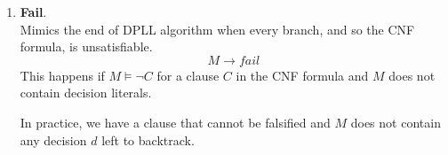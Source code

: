 \begin{enumerate}
    Note: \textbf{Backtrack} and \textbf{UnitPropogate} are little bit different. By UnitPropagate we can do something: incorporating literals $l$ to the formula we can still 
    satisfy the original clause; while in Backtrack there is no way to satisfy the clause $C$.
    \item \textbf{Fail}. \\ 
    Mimics the end of DPLL algorithm when every branch, and so the CNF formula, is unsatisfiable.
    $$ M \rightarrow \textit{fail} $$
    This happens if $M \models \neg C$ for a clause $C$ in the CNF formula and $M$ does not contain decision literals. \vspace{7pt}

    In practice, we have a clause that cannot be falsified and $M$ does not contain any decision $d$ left to backtrack.
\end{enumerate}